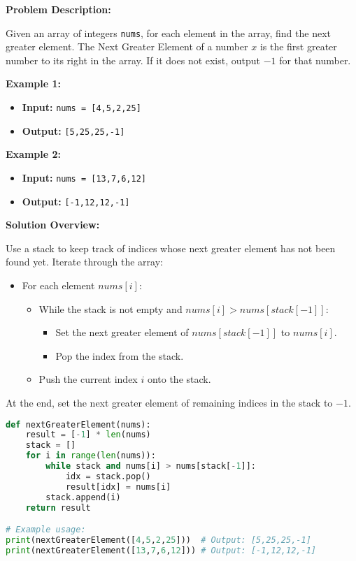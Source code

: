 

\textbf{Problem Description:}

Given an array of integers \texttt{nums}, for each element in the array, find the next greater element. The Next Greater Element of a number \( x \) is the first greater number to its right in the array. If it does not exist, output \(-1\) for that number.

\textbf{Example 1:}

\begin{itemize}
    \item \textbf{Input:} \texttt{nums = [4,5,2,25]}
    \item \textbf{Output:} \texttt{[5,25,25,-1]}
\end{itemize}

\textbf{Example 2:}

\begin{itemize}
    \item \textbf{Input:} \texttt{nums = [13,7,6,12]}
    \item \textbf{Output:} \texttt{[-1,12,12,-1]}
\end{itemize}

\textbf{Solution Overview:}

Use a stack to keep track of indices whose next greater element has not been found yet. Iterate through the array:

\begin{itemize}
    \item For each element \( nums[i] \):
        \begin{itemize}
            \item While the stack is not empty and \( nums[i] > nums[stack[-1]] \):
                \begin{itemize}
                    \item Set the next greater element of \( nums[stack[-1]] \) to \( nums[i] \).
                    \item Pop the index from the stack.
                \end{itemize}
            \item Push the current index \( i \) onto the stack.
        \end{itemize}
\end{itemize}

At the end, set the next greater element of remaining indices in the stack to \(-1\).

\begin{lstlisting}[language=Python]
def nextGreaterElement(nums):
    result = [-1] * len(nums)
    stack = []
    for i in range(len(nums)):
        while stack and nums[i] > nums[stack[-1]]:
            idx = stack.pop()
            result[idx] = nums[i]
        stack.append(i)
    return result

# Example usage:
print(nextGreaterElement([4,5,2,25]))  # Output: [5,25,25,-1]
print(nextGreaterElement([13,7,6,12])) # Output: [-1,12,12,-1]
\end{lstlisting}